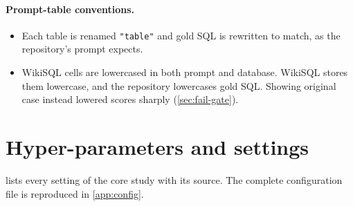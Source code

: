 \paragraph{Prompt-table conventions.}
\begin{itemize}
\item Each table is renamed \texttt{"table"} and gold SQL is rewritten to match, as the repository's prompt expects.
\item WikiSQL cells are lowercased in both prompt and database. WikiSQL stores them lowercase, and the repository
lowercases gold SQL. Showing original case instead lowered scores sharply (\cref{sec:fail-gate}).
\end{itemize}



\section{Hyper-parameters and settings}\label{sec:hparams}

 lists every setting of the core study with its source. The complete configuration file is
reproduced in \cref{app:config}.

